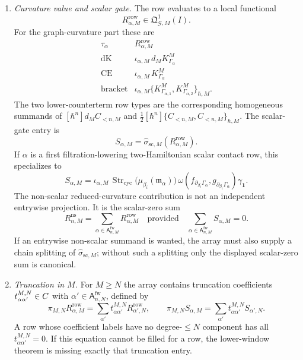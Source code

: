 \begin{defn}
\begin{enumerate}[label=(A\arabic*)]
    \item \emph{Curvature value and scalar gate.}  The row evaluates to a
    local functional
    \[
      R_{\alpha,M}^{\mathrm{row}}\in\mathfrak Q^1_{\mathcal G,M}(I).
    \]
    For the graph-curvature part these are
    \[
    \begin{array}{c|c}
      \tau_\alpha & R_{\alpha,M}^{\mathrm{row}} \\ \hline
      \mathrm{dK} & \iota_{\alpha,M}\,d_MK^M_{\Gamma_\alpha}\\
      \mathrm{CE} & \iota_{\alpha,M}\,K^M_{\Gamma_\alpha}\\
      \mathrm{bracket} &
        \iota_{\alpha,M}\{K^M_{\Gamma_{\alpha,1}},
        K^M_{\Gamma_{\alpha,2}}\}_{\hbar,M}.
    \end{array}
    \]
    The two lower-counterterm row types are the corresponding homogeneous
    summands of
    \([\hbar^n]d_MC_{<n,M}\) and
    \(\frac12[\hbar^n]\{C_{<n,M},C_{<n,M}\}_{\hbar,M}\).
    The scalar-gate entry is
    \[
      S_{\alpha,M}=
      \widehat\sigma_{\mathrm{sc},M}(R_{\alpha,M}^{\mathrm{row}}).
    \]
    If \(\alpha\) is a first filtration-lowering two-Hamiltonian scalar
    contact row, this specializes to
    \[
      S_{\alpha,M}=
      \iota_{\alpha,M}\,
      \operatorname{Str}_{\mathrm{cyc}}
        \bigl(\mu_{\beta_i}(\mathfrak m_\alpha)\bigr)\,
      \omega(f_{\partial_{\beta_i}\Gamma_\alpha},
             g_{\partial_{\beta_i}\Gamma_\alpha})
      \gamma_{\mathbf 1}.
    \]
    The non-scalar reduced-curvature contribution is not an independent
    entrywise projection.  It is the scalar-zero sum
    \[
      R^{\mathrm{ns}}_{n,M}
        =
      \sum_{\alpha\in\mathsf A^{\mathrm{fw}}_{n,M}}
        R_{\alpha,M}^{\mathrm{row}}
      \quad\text{provided}\quad
      \sum_{\alpha\in\mathsf A^{\mathrm{fw}}_{n,M}}S_{\alpha,M}=0.
    \]
    If an entrywise non-scalar summand is wanted, the array must also supply a
    chain splitting of \(\widehat\sigma_{\mathrm{sc},M}\); without such a
    splitting only the displayed scalar-zero sum is canonical.

    \item \emph{Truncation in \(M\).}  For \(M\geq N\) the array contains
    truncation coefficients \(t^{M,N}_{\alpha\alpha'}\in C\) with
    \(\alpha'\in\mathsf A^{\mathrm{fw}}_{n,N}\), defined by
    \[
      \pi_{M,N}R^{\mathrm{row}}_{\alpha,M}
        =
      \sum_{\alpha'}t^{M,N}_{\alpha\alpha'}R^{\mathrm{row}}_{\alpha',N},
      \qquad
      \pi_{M,N}S_{\alpha,M}
        =
      \sum_{\alpha'}t^{M,N}_{\alpha\alpha'}S_{\alpha',N}.
    \]
    A row whose coefficient labels have no degree-\(\leq N\) component has
    all \(t^{M,N}_{\alpha\alpha'}=0\).  If this equation cannot be filled for
    a row, the lower-window theorem is missing exactly that truncation
    entry.


\end{enumerate}
\end{defn}
